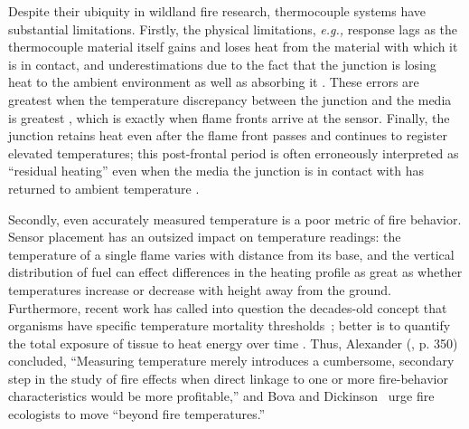 \documentclass[fire,article,accept,oneauthor,pdftex]{Definitions/mdpi}
\begin{document}
Despite their ubiquity in wildland fire research, thermocouple systems have substantial limitations. 
Firstly, the physical limitations, \emph{e.g.,} %
 response lags as the thermocouple material itself gains and loses heat from the material with which it is in contact, and  underestimations due to the fact that the junction is losing heat to the ambient environment as well as absorbing it \cite{walker1968,lemaire2017}.  These errors are greatest when the temperature discrepancy between the junction and the media is greatest \cite{blevins1999}, which is exactly when flame fronts arrive at the sensor.
Finally, the junction retains heat even after the flame front passes and continues to register elevated temperatures; this post-frontal %
period is often erroneously interpreted as ``residual heating'' even when the media the junction is in contact with has returned to ambient temperature \cite{mcgranahan2020a}. 


Secondly, even accurately measured temperature is a poor metric of fire behavior. 
Sensor placement has an outsized impact on temperature readings: the temperature of a single flame varies with distance from its base, and the vertical distribution of fuel can effect differences in the heating profile as great as whether temperatures increase or decrease with height away from the ground. 
Furthermore, recent work has called into question the decades-old concept that organisms have specific temperature mortality thresholds~\mbox{\cite{smith2016, pingree2019}}; better is to quantify the total exposure of tissue to heat energy over time \cite{wright1970, dickinson2004, bova2005}.
Thus, Alexander (\cite{alexander1982}, p. 350) concluded, ``Measuring temperature merely introduces a cumbersome, secondary step in the study of fire effects when direct linkage to one or more fire-behavior characteristics would be more profitable,'' and Bova and Dickinson~\cite{bova2008} urge fire ecologists to move ``beyond fire temperatures.''
\end{document}
